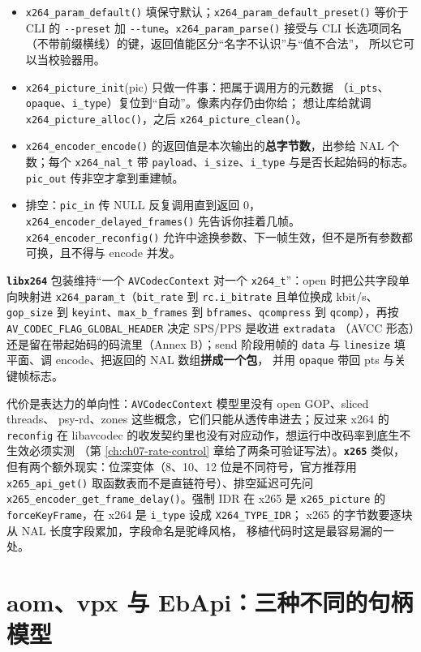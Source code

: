 \documentclass[12pt,a4paper,fontset=fandol]{ctexbook}
\newcommand{\Fn}[1]{\texttt{#1()}}
\newcommand{\Tp}[1]{\texttt{#1}}
\newcommand{\Opt}[1]{\texttt{-\/-#1}}
\newcommand{\Lib}[1]{\textbf{\texttt{#1}}}
\begin{document}
\begin{itemize}
\item \Fn{x264\_param\_default} 填保守默认；\Fn{x264\_param\_default\_preset}
  等价于 CLI 的 \Opt{preset} 加 \Opt{tune}。\Fn{x264\_param\_parse} 接受与 CLI
  长选项同名（不带前缀横线）的键，返回值能区分``名字不认识''与``值不合法''，
  所以它可以当校验器用。
\item \Tp{x264\_picture\_init}(pic) 只做一件事：把属于调用方的元数据
  （\Tp{i\_pts}、\Tp{opaque}、\Tp{i\_type}）复位到``自动''。像素内存仍由你给；
  想让库给就调 \Fn{x264\_picture\_alloc}，之后 \Fn{x264\_picture\_clean}。
\item \Fn{x264\_encoder\_encode} 的返回值是本次输出的\textbf{总字节数}，出参给
  NAL 个数；每个 \Tp{x264\_nal\_t} 带 \Tp{payload}、\Tp{i\_size}、\Tp{i\_type}
  与是否长起始码的标志。\Tp{pic\_out} 传非空才拿到重建帧。
\item 排空：\Tp{pic\_in} 传 NULL 反复调用直到返回 0，
  \Fn{x264\_encoder\_delayed\_frames} 先告诉你挂着几帧。\Fn{x264\_encoder\_reconfig}
  允许中途换参数、下一帧生效，但不是所有参数都可换，且不得与 encode 并发。
\end{itemize}

\Lib{libx264} 包装维持``一个 \Tp{AVCodecContext} 对一个 \Tp{x264\_t}''：open
时把公共字段单向映射进 \Tp{x264\_param\_t}（\Tp{bit\_rate} 到 \Tp{rc.i\_bitrate}
且单位换成 kbit/s、\Tp{gop\_size} 到 \Tp{keyint}、\Tp{max\_b\_frames} 到
\Tp{bframes}、\Tp{qcompress} 到 \Tp{qcomp}），再按
\Tp{AV\_CODEC\_FLAG\_GLOBAL\_HEADER} 决定 SPS/PPS 是收进 \Tp{extradata}
（AVCC 形态）还是留在带起始码的码流里（Annex B）；send 阶段用帧的 \Tp{data}
与 \Tp{linesize} 填平面、调 encode、把返回的 NAL 数组\textbf{拼成一个包}，
并用 \Tp{opaque} 带回 pts 与关键帧标志。

代价是表达力的单向性：\Tp{AVCodecContext} 模型里没有 open GOP、sliced threads、
psy-rd、zones 这些概念，它们只能从透传串进去；反过来 x264 的 \Tp{reconfig} 在
libavcodec 的收发契约里也没有对应动作，想运行中改码率到底生不生效必须实测
（第 \ref{ch:ch07-rate-control} 章给了两条可验证写法）。\Lib{x265} 类似，
但有两个额外现实：位深变体（8、10、12 位是不同符号，官方推荐用
\Fn{x265\_api\_get} 取函数表而不是直链符号）、排空延迟可先问
\Fn{x265\_encoder\_get\_frame\_delay}。强制 IDR 在 x265 是 \Tp{x265\_picture}
的 \Tp{forceKeyFrame}，在 x264 是 \Tp{i\_type} 设成 \Tp{X264\_TYPE\_IDR}；
x265 的字节数要逐块从 NAL 长度字段累加，字段命名是驼峰风格，
移植代码时这是最容易漏的一处。

\section{aom、vpx 与 EbApi：三种不同的句柄模型}
\end{document}
